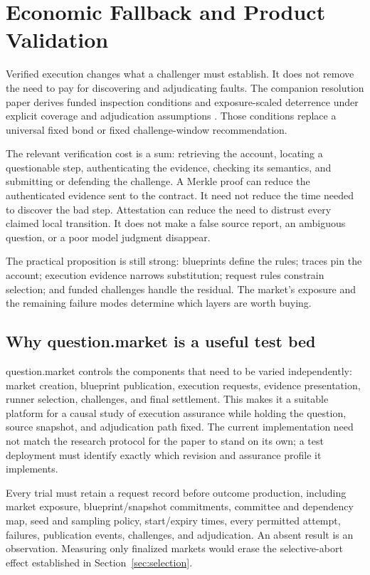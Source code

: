 \section{Economic Fallback and Product Validation}
\label{sec:product}

Verified execution changes what a challenger must establish. It does not remove the need to pay for discovering and adjudicating faults. The companion resolution paper derives funded inspection conditions and exposure-scaled deterrence under explicit coverage and adjudication assumptions \cite{trustexplicit2026}. Those conditions replace a universal fixed bond or fixed challenge-window recommendation.

The relevant verification cost is a sum: retrieving the account, locating a questionable step, authenticating the evidence, checking its semantics, and submitting or defending the challenge. A Merkle proof can reduce the authenticated evidence sent to the contract. It need not reduce the time needed to discover the bad step. Attestation can reduce the need to distrust every claimed local transition. It does not make a false source report, an ambiguous question, or a poor model judgment disappear.

The practical proposition is still strong: blueprints define the rules; traces pin the account; execution evidence narrows substitution; request rules constrain selection; and funded challenges handle the residual. The market's exposure and the remaining failure modes determine which layers are worth buying.

\subsection{Why question.market is a useful test bed}

question.market controls the components that need to be varied independently: market creation, blueprint publication, execution requests, evidence presentation, runner selection, challenges, and final settlement. This makes it a suitable platform for a causal study of execution assurance while holding the question, source snapshot, and adjudication path fixed. The current implementation need not match the research protocol for the paper to stand on its own; a test deployment must identify exactly which revision and assurance profile it implements.

Every trial must retain a request record before outcome production, including market exposure, blueprint/snapshot commitments, committee and dependency map, seed and sampling policy, start/expiry times, every permitted attempt, failures, publication events, challenges, and adjudication. An absent result is an observation. Measuring only finalized markets would erase the selective-abort effect established in Section~\ref{sec:selection}.

